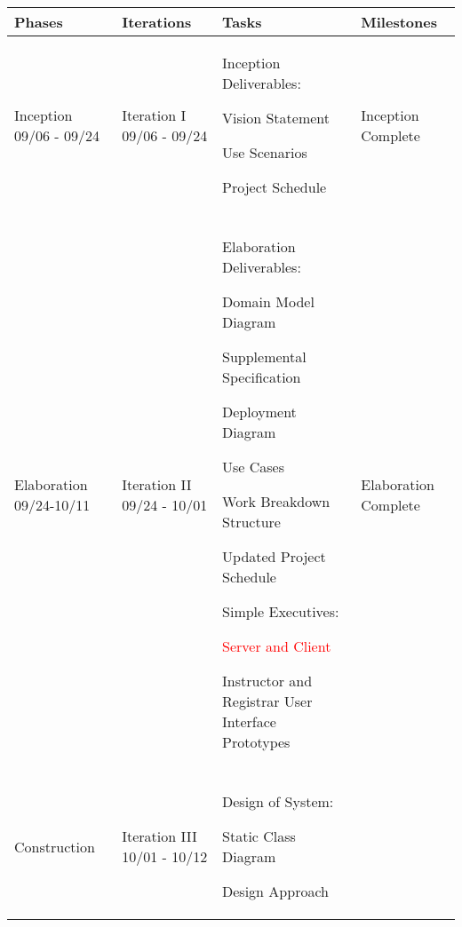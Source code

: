 \documentclass[11pt]{article}
\newenvironment{packed_itemize}{
\begin{itemize}
  \setlength{\itemsep}{1pt}
  \setlength{\parskip}{0pt}
  \setlength{\parsep}{0pt}
}{\end{itemize}}
\begin{document}
\begin{table}
\centering %
\begin{tabular}{|p{0.9in}|p{0.9in}|p{3.2in}|p{.9in}|}
\hline
\textbf{Phases}  & \textbf{Iterations}  & \textbf{Tasks}        & \textbf{Milestones} \\
\hline\hline
 Inception 09/06 - 09/24
   &  Iteration I 09/06 - 09/24  
	& Inception Deliverables:
	 \begin{packed_itemize} 
	\vspace{-0.15in}
		\item Vision Statement
		\item Use Scenarios
		\item Project Schedule
	\end{packed_itemize}
	\vspace{-0.4in}
	& Inception Complete\\
   &        & & \\
\hline
Elaboration 09/24-10/11& 
Iteration II 09/24 - 10/01& 
Elaboration Deliverables: 
	 \begin{packed_itemize} 
	\vspace{-0.15in}
		\item Domain Model Diagram
		\item Supplemental Specification
		\item Deployment Diagram
		\item Use Cases
		\item Work Breakdown Structure
		\item Updated Project Schedule
   \end{packed_itemize}

Simple Executives:
	\begin{packed_itemize}
		\vspace{-0.15in}
		\item \textcolor{red}{Server and Client}
		\item Instructor and Registrar User Interface Prototypes
	\end{packed_itemize}
   \vspace{-0.4in}
& Elaboration Complete
\\
& & & \\
\hline

\multirow{20}{*}{Construction }
 &
 Iteration III 10/01 - 10/12 &
 Design of System:
	\begin{packed_itemize}
		\vspace{-0.15in}
		\item Static Class Diagram
		\item Design Approach
	\end{packed_itemize}


\end{tabular}
\end{table}
\end{document}
